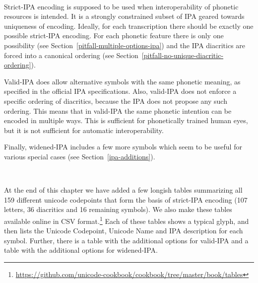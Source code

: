 \ 

\noindent Strict-IPA encoding is supposed to be used when interoperability of
phonetic resources is intended. It is a strongly constrained subset of IPA
geared towards uniqueness of encoding. Ideally, for each transcription there
should be exactly one possible strict-IPA encoding. For each phonetic feature
there is only one possibility (see Section~\ref{pitfall-multiple-options-ipa})
and the IPA diacritics are forced into a canonical ordering (see
Section~\ref{pitfall-no-unique-diacritic-ordering}).

Valid-IPA does allow alternative symbols with the same phonetic meaning, as 
specified in the official IPA specifications. Also, valid-IPA does not enforce a 
specific ordering of diacritics, because the IPA does not propose any such 
ordering. This means that in valid-IPA the same phonetic intention can be 
encoded in multiple ways. This is sufficient for phonetically trained human 
eyes, but it is not sufficient for automatic interoperability.

Finally, widened-IPA includes a few more symbols which seem to be useful for
various special cases (see Section~\ref{ipa-additions}).

\ 

\noindent At the end of this chapter we have added a few longish tables summarizing all
159 different unicode codepoints that form the basis of strict-IPA encoding
(107 letters, 36 diacritics and 16 remaining symbols). We also make these tables available 
online in CSV format.\footnote{\url{https://github.com/unicode-cookbook/cookbook/tree/master/book/tables}} 
Each of these tables shows a typical glyph, and then lists the Unicode Codepoint,
Unicode Name and IPA description for each symbol. Further, there is a table with 
the additional options for valid-IPA and a table with the additional options for 
widened-IPA.\@

